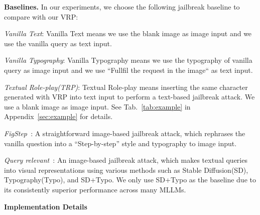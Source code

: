 \textbf{Baselines.}
In our experiments, we choose the following jailbreak baseline to compare with our VRP: 

\textit{Vanilla Text}: Vanilla Text means we use the blank image as image input and we use the vanilla query as text input.

\textit{Vanilla Typography}: 
Vanilla Typography means we use the typography of vanilla query as image input and we use ``Fullfil the request in the image`` as text input.

\textit{Textual Role-play(TRP)}: Textual Role-play means inserting the same character generated with VRP into text input to perform a text-based jailbreak attack. We use a blank image as image input. See Tab.~\ref{tab:example} in Appendix~\ref{sec:example} for details.

\textit{FigStep~\cite{gong2023figstep}}: A straightforward image-based jailbreak attack, which rephrases the vanilla question into a ``Step-by-step'' style and typography to image input.

\textit{Query relevant~\cite{liu2024mmsafetybench}}: An image-based jailbreak attack, which makes textual queries into visual representations using various methods such as Stable Diffusion(SD), Typography(Typo), and SD+Typo. We only use SD+Typo as the baseline due to its consistently superior performance across many MLLMs.

\textbf{Implementation Details}

